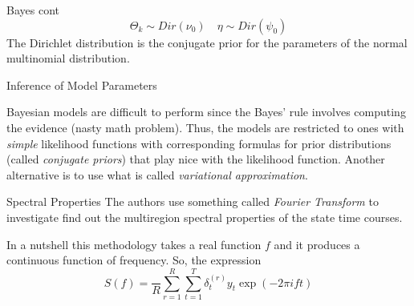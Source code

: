 \documentclass{beamer}
\begin{document}
\begin{frame}{Bayes cont}
	\begin{equation}
		\Theta_k \sim Dir(\nu_0) \quad \eta \sim Dir (\psi_0)
	\end{equation}
The Dirichlet distribution is the conjugate prior for the parameters of the normal multinomial distribution. 


\end{frame}

\begin{frame}{Inference of Model Parameters}
	
	Bayesian models are difficult to perform since the Bayes' rule involves computing the evidence (nasty math problem).
	Thus, the models are restricted to ones with \textit{simple} likelihood functions with corresponding formulas for prior distributions (called \textit{conjugate priors}) that play nice with the likelihood function. Another alternative is to use what is called \textit{variational approximation}. 
	
\end{frame}

\begin{frame}{Spectral Properties}
	The authors use something called \textit{Fourier Transform} to investigate find out the multiregion spectral properties of the state time courses.
	
	In a nutshell this methodology takes a real function $f$ and it produces a continuous function of frequency. 
	So, the expression
	\begin{equation}
		S(f)= \frac{}{R}\sum_{r=1}^{R} \sum_{t=1}^{T} \delta_t^{(r)}y_t \exp(-2\pi i f t)  
	\end{equation}


\end{frame}


	
	
	
	
	
\end{document}
